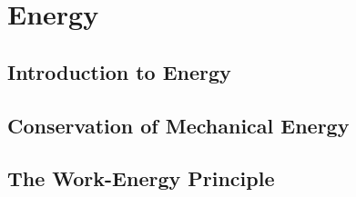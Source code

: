 \documentclass[../alevelmaths.tex]{subfiles}
\begin{document}
\chapter{Energy}
\section{Introduction to Energy}
\section{Conservation of Mechanical Energy}
\section{The Work-Energy Principle}
\end{document}
